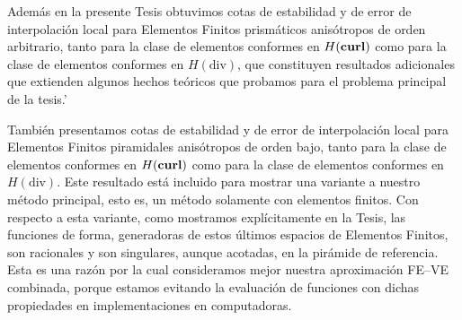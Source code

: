 \documentclass[12pt,a4paper,openany,oneside]{book}
\begin{document}
Adem\'as en la presente Tesis 
obtuvimos cotas de estabilidad y de error de interpolaci\'on
local para Elementos Finitos prism\'aticos anis\'otropos de orden
arbitrario, tanto para la clase de elementos
conformes en $H(\textbf{curl})$ como para 
la clase de elementos conformes en $H(\mbox{div})$, que 
constituyen resultados adicionales que extienden algunos hechos te\'oricos
que probamos para el problema principal de la tesis.'

Tambi\'en presentamos 
cotas de estabilidad y de error de interpolaci\'on
local para Elementos Finitos piramidales anis\'otropos 
de orden bajo, tanto para la clase de elementos
conformes en $H(\textbf{curl})$ como para 
la clase de elementos conformes en $H(\mbox{div})$. Este resultado
est\'a incluido para mostrar una variante a nuestro m\'etodo principal,
esto es, un m\'etodo solamente con elementos finitos. Con respecto a esta variante,
como
mostramos expl\'icitamente en la Tesis, las 
funciones de forma, generadoras de 
estos \'ultimos espacios de Elementos Finitos,
son racionales y son singulares, aunque acotadas,
en la pir\'amide de referencia. Esta es una raz\'on por la cual 
consideramos mejor nuestra aproximaci\'on FE--VE combinada, porque estamos
evitando la evaluaci\'on de funciones con dichas propiedades
en implementaciones en computadoras.

\newpage
\end{document}
